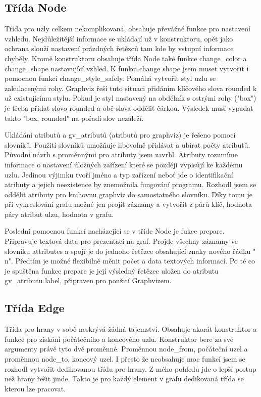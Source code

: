 \documentclass[color,table,oneside,nolot,nolof]{fithesis}
\begin{document}
\subsection{Třída Node}
	Třída pro uzly celkem nekomplikovaná, obsahuje převážně funkce pro nastavení vzhledu. Nejdůležitější informace se ukládají už v konstruktoru, opět jako ochrana slouží nastavení
	prázdných řetězců tam kde by vstupní informace chyběly. Kromě konstruktoru obsahuje třída Node také funkce change\_color a change\_shape nastavující vzhled. K funkci change shape 
	jsem muset vytvořit i pomocnou funkci change\_style\_safely. Pomáhá vytvořit styl uzlu se zakulacenými rohy. Graphviz řeší tuto situaci přidáním klíčového slova rounded k už 
	existujícímu stylu. Pokud je styl nastavený na obdélník s ostrými rohy ("box") je třeba přidat slovo rounded a obě slova oddělit čárkou. Výsledek musí vypadat takto "box, rounded"
	na pořadí slov nezáleží.

	Ukládání atributů a gv\_atributů (atributů pro graphviz) je řešeno pomocí slovníků. Použití slovníků umožňuje libovolně přidávat a ubírat počty atributů. Původní návrh s proměnnými
	pro atributy jsem zavrhl. Atributy rozumíme informace o nastavení úložných zařízení které se později vypisůjí ke každému uzlu. Jedinou výjimku tvoří jméno a typ zařízení neboť jde
	o identifikační atributy a jejich neexistence by znemožnila fungování programu. Rozhodl jsem se oddělit atributy pro knihovnu graphviz do samostatného slovníku. Díky tomu je při
	vykreslování grafu možné jen projít záznamy a vytvořit z párů klíč, hodnota páry atribut ulzu, hodnota v grafu. 

	Poslední pomocnou funkcí nacházející se v tříde Node je fukce prepare. Připravuje textová data pro prezentaci na graf. Projde všechny záznamy ve slovníku attributes a spojí je do 
	jednoho řetězce obsahující znaky nového řádku "\\n". Předtím je možné flexibilně měnit počet a data textových informací. Po té co je spuštěna funkce prepare je její výsledný řetězec
	uložen do atributu gv\_atributu label, připraven pro použití Graphvizem.

\subsection{Třída Edge}
	Třída pro hrany v sobě neskrývá žádná tajemství. Obsahuje akorát konstruktor a funkce pro získání počátečního a koncového uzlu. Konstruktor bere za své argumenty právě tyto dvě 
	proměnné. Proměnnou node\_from, počáteční uzel a proměnnou node\_to, koncový uzel. I přesto že neobsahuje moc funkcí jsem se rozhodl vytvořit dedikovanou třídu pro hrany. Z mého 
	pohledu jde o lepší postup než hrany řešit jinde. Takto je pro každý element v grafu dedikovaná třída se kterou lze pracovat.
\end{document}
